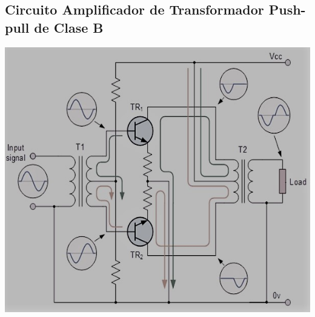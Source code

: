 \documentclass[12pt,a4paper]{article}
\begin{document}
\subsection{Circuito Amplificador de Transformador Push-pull de Clase B}
\begin{center}
\includegraphics[scale=.5]{imagenes/1ETAPA.JPG} 
\end{center}
\end{document}
